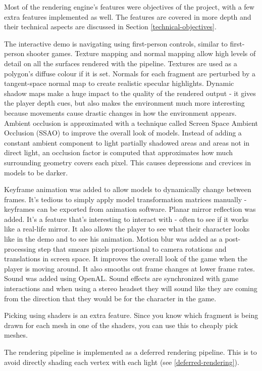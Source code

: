 \documentclass[oneside]{book}
\begin{document}
    Most of the rendering engine's features were objectives of the project, with a few extra features implemented as well. The features are covered in more depth and their technical aspects are discussed in Section \ref{technical-objectives}.

    The interactive demo is navigating using first-person controls, similar to first-person shooter games.
    Texture mapping and normal mapping allow high levels of detail on all the surfaces rendered with the pipeline. Textures are used as a polygon's diffuse colour if it is set. Normals for each fragment are perturbed by a tangent-space normal map to create realistic specular highlights.
    Dynamic shadow maps make a huge impact to the quality of the rendered output - it gives the player depth cues, but also makes the environment much more interesting because movements cause drastic changes in how the environment appears.
    Ambient occlusion is approximated with a technique called Screen Space Ambient Occlusion (SSAO) to improve the overall look of models. Instead of adding a constant ambient component to light partially shadowed areas and areas not in direct light, an occlusion factor is computed that approximates how much surrounding geometry covers each pixel. This causes depressions and crevices in models to be darker.

    Keyframe animation was added to allow models to dynamically change between frames. It's tedious to simply apply model transformation matrices manually - keyframes can be exported from animation software.
    Planar mirror reflection was added. It's a feature that's interesting to interact with - often to see if it works like a real-life mirror. It also allows the player to see what their character looks like in the demo and to see his animation.
    Motion blur was added as a post-processing step that smears pixels proportional to camera rotations and translations in screen space. It improves the overall look of the game when the player is moving around. It also smooths out frame changes at lower frame rates.
    Sound was added using OpenAL. Sound effects are synchronized with game interactions and when using a stereo headset they will sound like they are coming from the direction that they would be for the character in the game.

    Picking using shaders is an extra feature. Since you know which fragment is being drawn for each mesh in one of the shaders, you can use this to cheaply pick meshes.

    The rendering pipeline is implemented as a deferred rendering pipeline. This is to avoid directly shading each vertex with each light (see \ref{deferred-rendering}).
\end{document}
